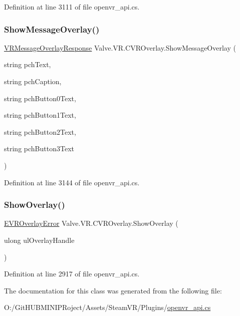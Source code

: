 Definition at line 3111 of file openvr\+\_\+api.\+cs.

\mbox{\label{class_valve_1_1_v_r_1_1_c_v_r_overlay_a8a66ef45b00adbf6aa674ca2f8976f92}} 
\subsubsection{\texorpdfstring{ShowMessageOverlay()}{ShowMessageOverlay()}}
{\footnotesize\ttfamily \mbox{\hyperlink{namespace_valve_1_1_v_r_a034ef9b0267f2fa2e4a227bc2c73473f}{V\+R\+Message\+Overlay\+Response}} Valve.\+V\+R.\+C\+V\+R\+Overlay.\+Show\+Message\+Overlay (\begin{DoxyParamCaption}\item[{string}]{pch\+Text,  }\item[{string}]{pch\+Caption,  }\item[{string}]{pch\+Button0\+Text,  }\item[{string}]{pch\+Button1\+Text,  }\item[{string}]{pch\+Button2\+Text,  }\item[{string}]{pch\+Button3\+Text }\end{DoxyParamCaption})}



Definition at line 3144 of file openvr\+\_\+api.\+cs.

\mbox{\label{class_valve_1_1_v_r_1_1_c_v_r_overlay_a68bd4f0b4ad82f2f28a6fa2702bd5151}} 
\subsubsection{\texorpdfstring{ShowOverlay()}{ShowOverlay()}}
{\footnotesize\ttfamily \mbox{\hyperlink{namespace_valve_1_1_v_r_aaee5c5144f42b7969d45b854f51b0c18}{E\+V\+R\+Overlay\+Error}} Valve.\+V\+R.\+C\+V\+R\+Overlay.\+Show\+Overlay (\begin{DoxyParamCaption}\item[{ulong}]{ul\+Overlay\+Handle }\end{DoxyParamCaption})}



Definition at line 2917 of file openvr\+\_\+api.\+cs.



The documentation for this class was generated from the following file\+:\begin{DoxyCompactItemize}
\item 
O\+:/\+Git\+H\+U\+B\+M\+I\+N\+I\+P\+Roject/\+Assets/\+Steam\+V\+R/\+Plugins/\mbox{\hyperlink{openvr__api_8cs}{openvr\+\_\+api.\+cs}}\end{DoxyCompactItemize}
